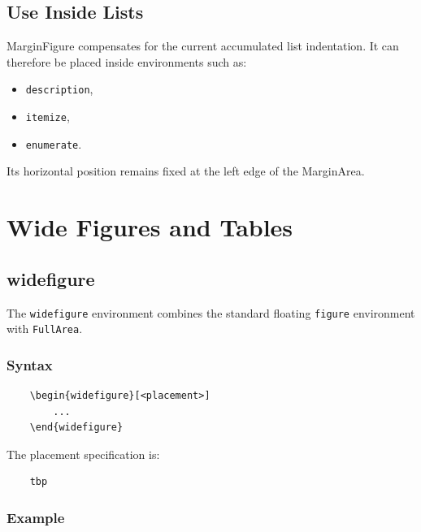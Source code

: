 \documentclass[
11pt,
a4paper,
oneside
]{scrbook}
\begin{document}
\section{Use Inside Lists}
	
MarginFigure compensates for the current accumulated list indentation.
It can therefore be placed inside environments such as:
\begin{itemize}
	\item \texttt{description},
	\item \texttt{itemize},
	\item \texttt{enumerate}.
\end{itemize}
Its horizontal position remains fixed at the left edge of the MarginArea.


\chapter{Wide Figures and Tables}
\label{chap:wide-objects}
	
\section{widefigure}

The \texttt{widefigure} environment combines the standard floating
\texttt{figure} environment with \texttt{FullArea}.

\subsection{Syntax}
	
\begin{verbatim}
	\begin{widefigure}[<placement>]
		...
	\end{widefigure}
\end{verbatim}
	
The  placement specification is:
	
\begin{verbatim}
	tbp
\end{verbatim}
	
\subsection{Example}
	
\end{document}
